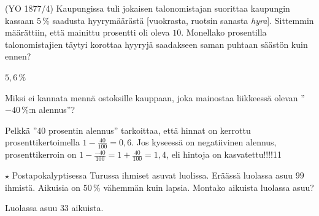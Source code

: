 \begin{tehtavasivu}

\begin{tehtava}
    (YO 1877/4) Kaupungissa tuli jokaisen talonomistajan suorittaa kaupungin kassaan $5\,\%$ saadusta hyyrymäärästä [vuokrasta, ruotsin sanasta \textit{hyra}]. Sittemmin määrättiin, että mainittu prosentti oli oleva $10$. Monellako prosentilla talonomistajien täytyi korottaa hyyryjä saadakseen saman puhtaan säästön kuin ennen?
    \begin{vastaus}
        $5,6\,\%$
    \end{vastaus}
\end{tehtava}
	
\begin{tehtava}
Miksi ei kannata mennä ostoksille kauppaan, joka mainostaa liikkeessä olevan ''$-40$\,\%:n alennus''?
	\begin{vastaus}
	Pelkkä ''$40$ prosentin alennus'' tarkoittaa, että hinnat on kerrottu prosenttikertoimella $1-\frac{40}{100}=0,6$. Jos kyseessä on negatiivinen alennus, prosenttikerroin on $1-\frac{-40}{100}=1+\frac{40}{100}=1,4$, eli hintoja on kasvatettu!!!!11
	\end{vastaus}
\end{tehtava}

\begin{tehtava} 
		$\star$ Postapokalyptisessa Turussa ihmiset asuvat luolissa. Eräässä luolassa asuu $99$ ihmistä. Aikuisia on $50\,\%$ vähemmän kuin lapsia. Montako aikuista luolassa asuu?
	\begin{vastaus}
	Luolassa asuu $33$ aikuista.
	\end{vastaus}
\end{tehtava} %

\end{tehtavasivu}